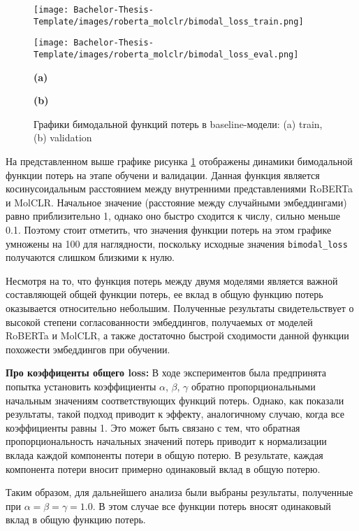 \begin{figure}[h]
    \begin{minipage}{0.5\textwidth}
        \centering
        \texttt{[image: Bachelor-Thesis-Template/images/roberta\_molclr/bimodal\_loss\_train.png]}
    \end{minipage}%
    \begin{minipage}{0.5\textwidth}
        \centering
        \texttt{[image: Bachelor-Thesis-Template/images/roberta\_molclr/bimodal\_loss\_eval.png]}
    \end{minipage}%

    \newline
    \begin{minipage}{0.5\textwidth}
      \centering
    \textbf{(a)}
    \end{minipage}%
    \begin{minipage}{0.5\textwidth}
    \centering
    \textbf{(b)}
    \end{minipage}%
    
    \caption{\small Графики бимодальной функций потерь в baseline-модели: (a) train, (b) validation}
    \label{fig:bimodal_loss_bimodal}
\end{figure}

На представленном выше графике рисунка \ref{fig:bimodal_loss_bimodal} отображены динамики бимодальной функции потерь на этапе обучени и валидации. Данная функция является косинусоидальным расстоянием между внутренними представлениями RoBERTa и MolCLR. Начальное значение (расстояние между случайными эмбеддингами) равно приблизительно 1, однако оно быстро сходится к числу, сильно меньше 0.1. Поэтому стоит отметить, что значения функции потерь на этом графике умножены на 100 для наглядности, поскольку исходные значения \texttt{bimodal\_loss} получаются слишком близкими к нулю.

Несмотря на то, что функция потерь между двумя моделями является важной составляющей общей функции потерь, ее вклад в общую функцию потерь оказывается относительно небольшим. Полученные результаты свидетельствует о высокой степени согласованности эмбеддингов, получаемых от моделей RoBERTa и MolCLR, а также достаточно быстрой сходимости данной функции похожести эмбеддингов при обучении.

\textbf{Про коэффиценты общего loss:}
В ходе экспериментов была предпринята попытка установить коэффициенты $\alpha$, $\beta$, $\gamma$ обратно пропорциональными начальным значениям соответствующих функций потерь. Однако, как показали результаты, такой подход приводит к эффекту, аналогичному случаю, когда все коэффициенты равны 1. Это может быть связано с тем, что обратная пропорциональность начальных значений потерь приводит к нормализации вклада каждой компоненты потери в общую потерю. В результате, каждая компонента потери вносит примерно одинаковый вклад в общую потерю.

Таким образом, для дальнейшего анализа были выбраны результаты, полученные при $\alpha = \beta = \gamma = 1.0$. В этом случае все функции потерь вносят одинаковый вклад в общую функцию потерь.



\newpage

